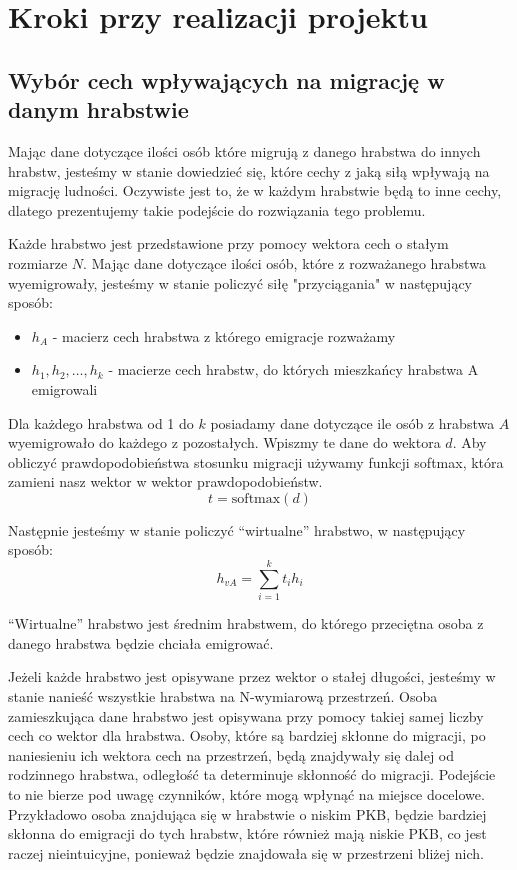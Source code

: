 \documentclass[a4paper,12pt]{article}
\newcommand{\softmax}{\mathrm{softmax}}
\begin{document}
\section*{Kroki przy realizacji projektu}
\subsection*{Wybór cech wpływających na migrację w danym hrabstwie}
Mając dane dotyczące ilości osób które migrują z danego hrabstwa do innych hrabstw, jesteśmy w stanie dowiedzieć się, które cechy z jaką siłą wpływają na migrację ludności. Oczywiste jest to, że w każdym hrabstwie będą to inne cechy, dlatego prezentujemy takie podejście do rozwiązania tego problemu.

Każde hrabstwo jest przedstawione przy pomocy wektora cech o stałym rozmiarze $N$. Mając dane dotyczące ilości osób, które z rozważanego hrabstwa wyemigrowały, jesteśmy w stanie policzyć siłę "przyciągania" w następujący sposób:
\begin{itemize}
    \item $h_A$ - macierz cech hrabstwa z którego emigracje rozważamy
    \item $h_1, h_2, \dots, h_k$ - macierze cech hrabstw, do których mieszkańcy hrabstwa A emigrowali
\end{itemize}
Dla każdego hrabstwa od 1 do $k$ posiadamy dane dotyczące ile osób z hrabstwa $A$ wyemigrowało do każdego z pozostałych. Wpiszmy te dane do wektora $d$. Aby obliczyć prawdopodobieństwa stosunku migracji używamy funkcji softmax, która zamieni nasz wektor w wektor prawdopodobieństw.
\begin{equation}
    t = \softmax(d)
\end{equation}

Następnie jesteśmy w stanie policzyć ``wirtualne'' hrabstwo, w następujący sposób:
\begin{equation}
    h_{vA} = \sum_{i=1}^{k} t_i h_i
\end{equation}

``Wirtualne'' hrabstwo jest średnim hrabstwem, do którego przeciętna osoba z danego hrabstwa będzie chciała emigrować.

Jeżeli każde hrabstwo jest opisywane przez wektor o stałej długości, jesteśmy w stanie nanieść wszystkie hrabstwa na N-wymiarową przestrzeń. Osoba zamieszkująca dane hrabstwo jest opisywana przy pomocy takiej samej liczby cech co wektor dla hrabstwa. Osoby, które są bardziej skłonne do migracji, po naniesieniu ich wektora cech na przestrzeń, będą znajdywały się dalej od rodzinnego hrabstwa, odległość ta determinuje skłonność do migracji. Podejście to nie bierze pod uwagę czynników, które mogą wpłynąć na miejsce docelowe. Przykładowo osoba znajdująca się w hrabstwie o niskim PKB, będzie bardziej skłonna do emigracji do tych hrabstw, które również mają niskie PKB, co jest raczej nieintuicyjne, ponieważ będzie znajdowała się w przestrzeni bliżej nich.
\end{document}
